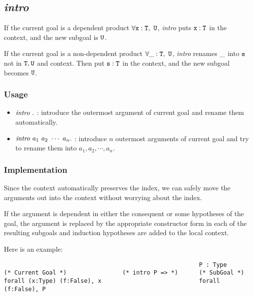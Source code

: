 \subsection{\it intro}

If the current goal is a dependent product $\tt \forall x:T,\ U$, \textit{intro} puts 
$\tt x:T$ in the context, and the new subgoal is $\tt U$.\par
If the current goal is a non-dependent product $\tt \forall \_:T,\ U$, \textit{intro} renames
$\tt \_$ into $\tt s$ not in $\tt T,U$ and context. Then put $\tt s:T$ in the context, 
and the new subgoal becomes $\tt U$.

\subsubsection*{Usage}
\begin{itemize}
\item ${\it intro}\ .$ : introduce the outermost argument of current goal and rename them automatically.
\item ${\it intro}\ a_1\ a_2\ \cdots\ a_n.$ : introduce $n$ outermost arguments of current goal and
try to rename them into $a_1,a_2,\cdots,a_n$.
\end{itemize}

\subsubsection*{Implementation}
Since the context automatically preserves the index, we
can safely move the arguments out into the context without worrying about the index.

If the argument is dependent in either the consequent or some hypotheses of the goal,
the argument is replaced by the appropriate constructor form in each of the resulting subgoals
and induction hypotheses are added to the local context.

Here is an example:
\begin{center}
\begin{minipage}{\textwidth}
\begin{verbatim}
                                                        P : Type
(* Current Goal *)                (* intro P => *)      (* SubGoal *) 
forall (x:Type) (f:False), x                            forall (f:False), P
\end{verbatim}
\end{minipage}
\end{center}

